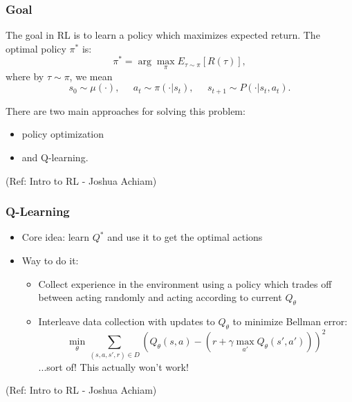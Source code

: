 \begin{frame}[fragile]\frametitle{Goal}

The goal in RL is to learn a policy which maximizes expected return. The optimal policy $\pi^*$ is:
%
\begin{equation*}
\pi^* = \arg \max_{\pi} E_{\tau \sim \pi}[R(\tau)],
\end{equation*}
%
where by $\tau \sim \pi$, we mean
%
\begin{equation*}
s_0 \sim \mu(\cdot), \;\;\;\;\; a_t \sim \pi(\cdot|s_t), \;\;\;\;\; s_{t+1} \sim P(\cdot | s_t, a_t).
\end{equation*}


There are two main approaches for solving this problem:
\begin{itemize}
\item policy optimization
\item and Q-learning.
\end{itemize}


{\tiny (Ref: Intro to RL - Joshua Achiam)}


\end{frame}

\begin{frame}[fragile]\frametitle{Q-Learning}

\begin{itemize}
\item Core idea: learn $Q^*$ and use it to get the optimal actions
\item Way to do it:
\begin{itemize}
\item Collect experience in the environment using a policy which trades off between acting randomly and acting according to current $Q_{\theta}$
\item Interleave data collection with updates to $Q_{\theta}$ to minimize Bellman error:
%
\begin{equation*}
\min_{\theta} \sum_{(s,a,s',r)\in D} \left(Q_{\theta}(s,a) - \left(r + \gamma \max_{a'} Q_{\theta}(s',a') \right) \right)^2
\end{equation*}
...sort of! This actually won't work!
\end{itemize}

\end{itemize}
{\tiny (Ref: Intro to RL - Joshua Achiam)}


\end{frame}


